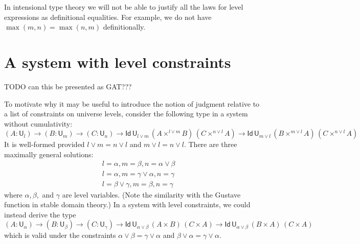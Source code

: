 \documentclass[11pt,a4paper]{article}
\newcommand{\Id}{\mathsf{Id}}
\def\UU{\mathsf{U}}
\begin{document}
In intensional type theory we will not be able to justify all the laws for level expressions as definitional equalities. For example, we do not have $\max(m,n)=\max(n,m)$ definitionally.

\section{A system with level constraints}\label{sec:constraints}


TODO   can this be presented as GAT???


To motivate why it may be useful to introduce the notion of judgment relative to a list of constraints on universe levels, consider the following type in a system without cumulativity:
%
$$
    (A : \UU_l) \to (B : \UU_m) \to (C : \UU_n)
    \to \Id\,\UU_{l \vee m}\, (A\times^{l \vee m} B)\,(C \times^{n \vee l} A)
    \to \Id\,\UU_{m \vee l} \, (B\times^{m \vee l} A)\,(C \times^{n \vee l} A)
$$
It is well-formed provided $l \vee m = n \vee l$ and $m \vee l = n \vee l$. There are three maximally general solutions:
\begin{eqnarray*}
&&l = \alpha, m = \beta, n = \alpha \vee \beta\\
&&l = \alpha, m = \gamma \vee \alpha, n = \gamma\\
&&l = \beta \vee \gamma, m = \beta, n = \gamma
\end{eqnarray*}
where $\alpha, \beta,$ and $\gamma$ are level variables.
%
(Note the similarity with the Gustave function in stable domain theory.)
In a system with level constraints, we could instead derive the type
$$
    (A : \UU_\alpha) \to (B : \UU_\beta) \to (C : \UU_\gamma)
    \to \Id\,\UU_{\alpha \vee \beta}\, (A\times B)\,(C \times A)
    \to \Id\,\UU_{\alpha \vee \beta}\, (B\times A)\,(C \times A)
$$
which is valid under the constraints
$
\alpha \vee \beta = \gamma \vee \alpha
$
and
$
\beta \vee \alpha = \gamma \vee \alpha.
$
\end{document}

